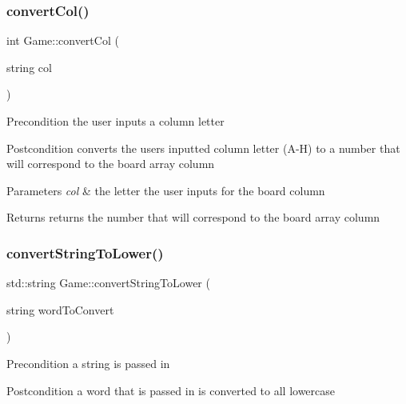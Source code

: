 \subsubsection{\texorpdfstring{convert\+Col()}{convertCol()}}
{\footnotesize\ttfamily int Game\+::convert\+Col (\begin{DoxyParamCaption}\item[{string}]{col }\end{DoxyParamCaption})}

\begin{DoxyPrecond}{Precondition}
the user inputs a column letter 
\end{DoxyPrecond}
\begin{DoxyPostcond}{Postcondition}
converts the user\textquotesingle{}s inputted column letter (A-\/H) to a number that will correspond to the board array column 
\end{DoxyPostcond}

\begin{DoxyParams}{Parameters}
{\em col} & the letter the user inputs for the board column \\
\hline
\end{DoxyParams}
\begin{DoxyReturn}{Returns}
returns the number that will correspond to the board array column 
\end{DoxyReturn}
\mbox{\label{classGame_afc9a0a0e86c33685d5920cb27061f756}} 
\subsubsection{\texorpdfstring{convert\+String\+To\+Lower()}{convertStringToLower()}}
{\footnotesize\ttfamily std\+::string Game\+::convert\+String\+To\+Lower (\begin{DoxyParamCaption}\item[{string}]{word\+To\+Convert }\end{DoxyParamCaption})}

\begin{DoxyPrecond}{Precondition}
a string is passed in 
\end{DoxyPrecond}
\begin{DoxyPostcond}{Postcondition}
a word that is passed in is converted to all lowercase 
\end{DoxyPostcond}

